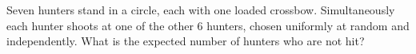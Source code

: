 Seven hunters stand in a circle, each with one loaded crossbow. Simultaneously each hunter shoots at one of the other $6$ hunters, chosen uniformly at random and independently. What is the expected number of hunters who are not hit?

